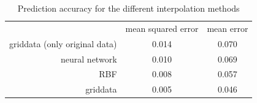 \begin{table}[b]
	\centering 
	\begin{tabular}{rcc}
		& {mean squared error} & {mean error} \\
		griddata (only original data) &        0.014         &    0.070     \\
		neural network &        0.010         &    0.069     \\
		RBF &        0.008         &    0.057     \\
		griddata &        0.005         &    0.046
	\end{tabular}
	\caption{Prediction accuracy for the different interpolation methods}
	\label{tab:comparison}
\end{table}
